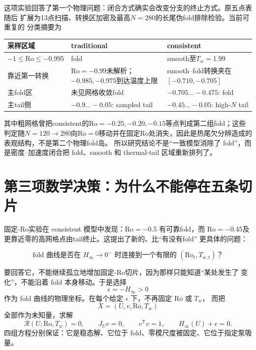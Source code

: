 \documentclass[UTF8,zihao=-4,openany]{ctexbook}
\newcommand{\eps}{\epsilon}
\newcommand{\Ro}{\mathrm{Ro}}
\newcommand{\R}{\mathcal R}
\begin{document}
这项实验回答了第一个物理问题：闭合方式确实会改变分支的终止方式。原五点表随后
扩展为13点扫描、转换区加密及最高$N=280$的长尾伪fold排除检验。当前可重复的
分类摘要为
\begin{center}
\small
\begin{tabular}{p{}p{}p{}}
\toprule
采样区域 & traditional & consistent\\
\midrule
$-1\le\Ro\le-0.995$ & fold & smooth至$T_w=1.99$\\
靠近第一转换 & $\Ro=-0.99$未解析；$-0.985,-0.975$到达温度上限 &
smooth--fold转换夹在$[-0.710,-0.705]$\\
主fold区 & 未见网格收敛fold & $-0.705\ldots-0.475$: fold\\
主tail侧 & $-0.9\ldots-0.05$: sampled tail & $-0.45\ldots-0.05$: high-$N$ tail\\
\bottomrule
\end{tabular}
\end{center}
其中粗网格曾把consistent的$\Ro=-0.25,-0.20,-0.15$等点判成第二组fold；这些
判定随$N=120\to280$向$\Ro=0$移动并在固定$\Ro$处消失，因此是热尾欠分辨造成的
表观结构，不是第二个物理fold岛。
所以研究结论不是“一致模型消除了 fold”，而是密度--加速度闭合把 fold、smooth
和 thermal-tail 区域重新排列了。

\section{第三项数学决策：为什么不能停在五条切片}

固定-$\Ro$实验在 consistent 模型中发现：$\Ro=-0.5$ 有可靠fold，而
$\Ro=-0.45$及更靠近零的高网格点由tail终止。这提出了新的、比“有没有fold”
更具体的问题：

\begin{equation*}
 \text{fold 曲线是否在 }H_\infty\to0^-\text{ 时连接到一个有限的 }
 (\Ro_t,T_{w,t})\text{？}
\end{equation*}

要回答它，不能继续孤立地增加固定-$\Ro$切片，因为那样只能知道“某处发生了
变化”，不能沿着 fold 本身移动。于是选择
\begin{equation}
 \eps=-H_\infty>0
\end{equation}
作为 fold 曲线的物理坐标。在每个给定 $\eps$ 下，不再固定 $\Ro$ 或 $T_w$，
而把
\begin{equation}
 X=(U,v,\Ro,T_w)
\end{equation}
全部作为未知量，求解
\begin{equation}\label{eq:mainline_augmented}
 \R(U;\Ro,T_w)=0,\qquad J_Uv=0,\qquad
 v^\mathsf{T}v=1,\qquad H_\infty(U)+\eps=0.
\end{equation}
四组方程分别保证：它是稳态解、它位于 fold、零模尺度被固定、它位于指定泵吸量。
\end{document}
